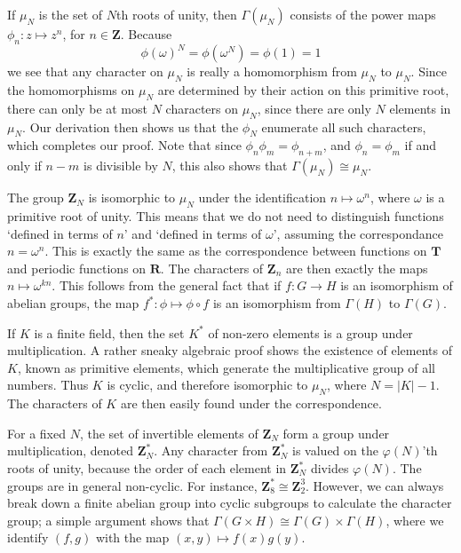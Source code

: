\begin{example}
    If $\mu_N$ is the set of $N$th roots of unity, then $\Gamma(\mu_N)$ consists of the power maps $\phi_n: z \mapsto z^n$, for $n \in \mathbf{Z}$. Because
    \[ \phi(\omega)^N = \phi(\omega^N) = \phi(1) = 1 \]
    we see that any character on $\mu_N$ is really a homomorphism from $\mu_N$ to $\mu_N$. Since the homomorphisms on $\mu_N$ are determined by their action on this primitive root, there can only be at most $N$ characters on $\mu_N$, since there are only $N$ elements in $\mu_N$. Our derivation then shows us that the $\phi_N$ enumerate all such characters, which completes our proof. Note that since $\phi_n \phi_m = \phi_{n+m}$, and $\phi_n = \phi_m$ if and only if $n - m$ is divisible by $N$, this also shows that $\Gamma(\mu_N) \cong \mu_N$.
\end{example}

\begin{example}
    The group $\mathbf{Z}_N$ is isomorphic to $\mu_N$ under the identification $n \mapsto \omega^n$, where $\omega$ is a primitive root of unity. This means that we do not need to distinguish functions `defined in terms of $n$' and `defined in terms of $\omega$', assuming the correspondance $n = \omega^n$. This is exactly the same as the correspondence between functions on $\mathbf{T}$ and periodic functions on $\mathbf{R}$. The characters of $\mathbf{Z}_n$ are then exactly the maps $n \mapsto \omega^{kn}$. This follows from the general fact that if $f: G \to H$ is an isomorphism of abelian groups, the map $f^*: \phi \mapsto \phi \circ f$ is an isomorphism from $\Gamma(H)$ to $\Gamma(G)$.
\end{example}

\begin{example}
    If $K$ is a finite field, then the set $K^*$ of non-zero elements is a group under multiplication. A rather sneaky algebraic proof shows the existence of elements of $K$, known as primitive elements, which generate the multiplicative group of all numbers. Thus $K$ is cyclic, and therefore isomorphic to $\mu_N$, where $N = |K| - 1$. The characters of $K$ are then easily found under the correspondence.
\end{example}

\begin{example}
    For a fixed $N$, the set of invertible elements of $\mathbf{Z}_N$ form a group under multiplication, denoted $\mathbf{Z}_N^*$. Any character from $\mathbf{Z}_N^*$ is valued on the $\varphi(N)$'th roots of unity, because the order of each element in $\mathbf{Z}_N^*$ divides $\varphi(N)$. The groups are in general non-cyclic. For instance, $\mathbf{Z}_8^* \cong \mathbf{Z}_2^3$. However, we can always break down a finite abelian group into cyclic subgroups to calculate the character group; a simple argument shows that $\Gamma(G \times H) \cong \Gamma(G) \times \Gamma(H)$, where we identify $(f,g)$ with the map $(x,y) \mapsto f(x)g(y)$.
\end{example}

